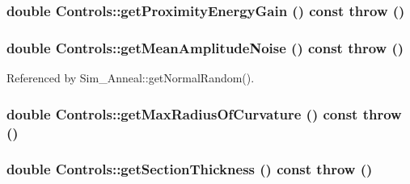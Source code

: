 \hypertarget{classControls_c07acead6db3d81b104d2604d599660e}{
\subsubsection[getProximityEnergyGain]{\setlength{\rightskip}{0pt plus 5cm}double Controls::getProximityEnergyGain () const  throw ()}}
\label{classControls_c07acead6db3d81b104d2604d599660e}


\hypertarget{classControls_68ea9d72317226e8c95e60dc40a6beb6}{
\subsubsection[getMeanAmplitudeNoise]{\setlength{\rightskip}{0pt plus 5cm}double Controls::getMeanAmplitudeNoise () const  throw ()}}
\label{classControls_68ea9d72317226e8c95e60dc40a6beb6}




Referenced by Sim\_\-Anneal::getNormalRandom().\hypertarget{classControls_48e342e9425d94235ec8a73002815268}{
\subsubsection[getMaxRadiusOfCurvature]{\setlength{\rightskip}{0pt plus 5cm}double Controls::getMaxRadiusOfCurvature () const  throw ()}}
\label{classControls_48e342e9425d94235ec8a73002815268}


\hypertarget{classControls_066ed1d2f58c990a3d269df94f65b553}{
\subsubsection[getSectionThickness]{\setlength{\rightskip}{0pt plus 5cm}double Controls::getSectionThickness () const  throw ()}}
\label{classControls_066ed1d2f58c990a3d269df94f65b553}




